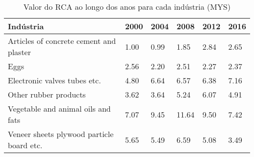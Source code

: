 \begin{table}
\centering
\caption{Valor do RCA ao longo dos anos para cada indústria (MYS)}
\label{tab:ex3-tempo-MYS}
\begin{tabular}{p{6cm}p{1.5cm}p{1.5cm}p{1.5cm}p{1.5cm}p{1.5cm}}
\toprule
                                Indústria & 2000 & 2004 &  2008 & 2012 & 2016 \\
\midrule
  Articles of concrete cement and plaster & 1.00 & 0.99 &  1.85 & 2.84 & 2.65 \\
                                     Eggs & 2.56 & 2.20 &  2.51 & 2.27 & 2.37 \\
             Electronic valves tubes etc. & 4.80 & 6.64 &  6.57 & 6.38 & 7.16 \\
                    Other rubber products & 3.62 & 3.64 &  5.24 & 6.07 & 4.91 \\
       Vegetable and animal oils and fats & 7.07 & 9.45 & 11.64 & 9.50 & 7.42 \\
Veneer sheets plywood particle board etc. & 5.65 & 5.49 &  6.59 & 5.08 & 3.49 \\
\bottomrule
\end{tabular}
\end{table}
